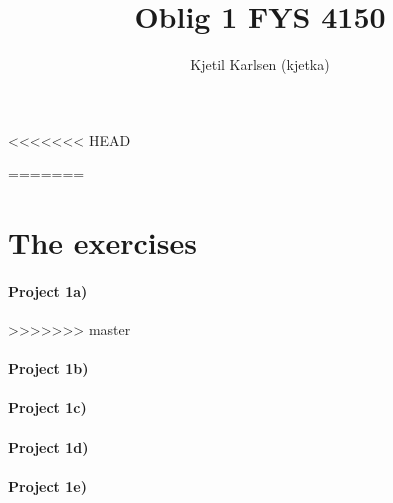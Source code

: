 


\title{Oblig 1 FYS 4150}
\author{Kjetil Karlsen (kjetka)}




\maketitle

<<<<<<< HEAD

=======
\section{The exercises}
\paragraph{Project 1a)}
>>>>>>> master

\paragraph{Project 1b)}

\paragraph{Project 1c)}

\paragraph{Project 1d)}

\paragraph{Project 1e)}



